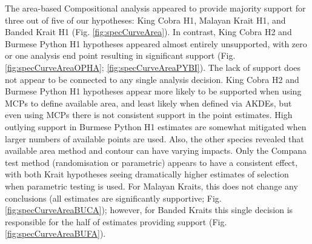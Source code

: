 \documentclass[10pt,a4paper]{article}
\begin{document}
The area-based Compositional analysis appeared to provide majority support for three out of five of our hypotheses: King Cobra H1, Malayan Krait H1, and Banded Krait H1 (Fig. \ref{fig:specCurveArea}).
In contrast, King Cobra H2 and Burmese Python H1 hypotheses appeared almost entirely unsupported, with zero or one analysis end point resulting in significant support (Fig. \ref{fig:specCurveAreaOPHA}; \ref{fig:specCurveAreaPYBI}).
The lack of support does not appear to be connected to any single analysis decision.
King Cobra H2 and Burmese Python H1 hypotheses appear more likely to be supported when using MCPs to define available area, and least likely when defined via AKDEs, but even using MCPs there is not consistent support in the point estimates.
High outlying support in Burmese Python H1 estimates are somewhat mitigated when larger numbers of available points are used.
Also, the other species revealed that available area method and contour can have varying impacts.
Only the Compana test method (randomisation or parametric) appears to have a consistent effect, with both Krait hypotheses seeing dramatically higher estimates of selection when parametric testing is used.
For Malayan Kraits, this does not change any conclusions (all estimates are significantly supportive; Fig. \ref{fig:specCurveAreaBUCA}); however, for Banded Kraits this single decision is responsible for the half of estimates providing support (Fig. \ref{fig:specCurveAreaBUFA}).
\end{document}
